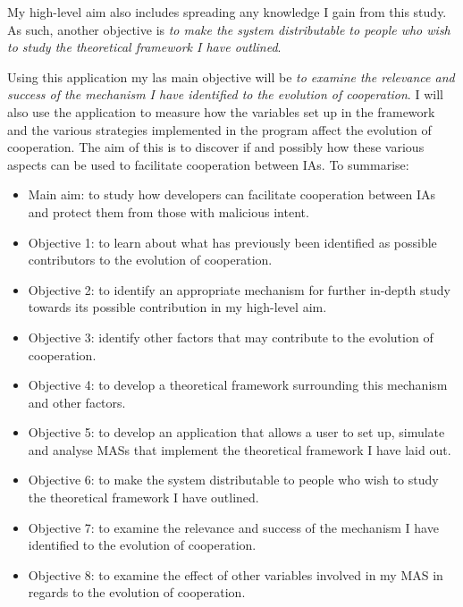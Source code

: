 \documentclass[]{final_report}
\begin{document}
My high-level aim also includes spreading any knowledge I gain from this study. As such, another objective is \textit{to make the system distributable to people who wish to study the theoretical framework I have outlined}.\par
Using this application my las main objective will be \textit{to examine the relevance and success of the mechanism I have identified to the evolution of cooperation}. I will also use the application to measure how the variables set up in the framework and the various strategies implemented in the program affect the evolution of cooperation. The aim of this is to discover if and possibly how these various aspects can be used to facilitate cooperation between IAs.
To summarise:
\begin{itemize}
	\item Main aim: to study how developers can facilitate cooperation between IAs and protect them from those with malicious intent.
	\item Objective 1: to learn about what has previously been identified as possible contributors to the evolution of cooperation.
	\item Objective 2: to identify an appropriate mechanism for further in-depth study towards its possible contribution in my high-level aim.
	\item Objective 3: identify other factors that may contribute to the evolution of cooperation.
	\item Objective 4: to develop a theoretical framework surrounding this mechanism and other factors.
	\item Objective 5: to develop an application that allows a user to set up, simulate and analyse MASs that implement the theoretical framework I have laid out.
	\item Objective 6: to make the system distributable to people who wish to study the theoretical framework I have outlined.
	\item Objective 7: to examine the relevance and success of the mechanism I have identified to the evolution of cooperation.
	\item Objective 8: to examine the effect of other variables involved in my MAS in regards to the evolution of cooperation.
\end{itemize}
\end{document}
